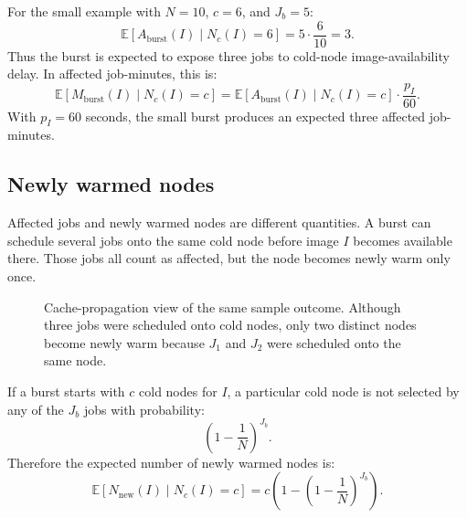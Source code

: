 \documentclass[11pt,a4paper]{article}
\newcommand{\E}{\mathbb{E}}
\begin{document}
For the small example with \(N=10\), \(c=6\), and \(J_b=5\):
\begin{equation}
\E[A_{\mathrm{burst}}(I)\mid N_c(I)=6]
=
5\cdot\frac{6}{10}
=
3.
\end{equation}
Thus the burst is expected to expose three jobs to cold-node image-availability delay. In affected job-minutes, this is:
\begin{equation}
\E[M_{\mathrm{burst}}(I)\mid N_c(I)=c]
=
\E[A_{\mathrm{burst}}(I)\mid N_c(I)=c]\cdot\frac{p_I}{60}.
\end{equation}
With \(p_I=60\) seconds, the small burst produces an expected three affected job-minutes.

\subsection{Newly warmed nodes}

Affected jobs and newly warmed nodes are different quantities. A burst can schedule several jobs onto the same cold node before image \(I\) becomes available there. Those jobs all count as affected, but the node becomes newly warm only once.

\begin{figure}[H]
\centering
{}
\caption{Cache-propagation view of the same sample outcome. Although three jobs were scheduled onto cold nodes, only two distinct nodes become newly warm because \(J_1\) and \(J_2\) were scheduled onto the same node.}
\label{fig:nodedots-cache}
\end{figure}

If a burst starts with \(c\) cold nodes for \(I\), a particular cold node is not selected by any of the \(J_b\) jobs with probability:
\begin{equation}
\left(1-\frac{1}{N}\right)^{J_b}.
\end{equation}
Therefore the expected number of newly warmed nodes is:
\begin{equation}
\E[N_{\mathrm{new}}(I)\mid N_c(I)=c]
=
c\left(1-\left(1-\frac{1}{N}\right)^{J_b}\right).
\end{equation}
\end{document}
